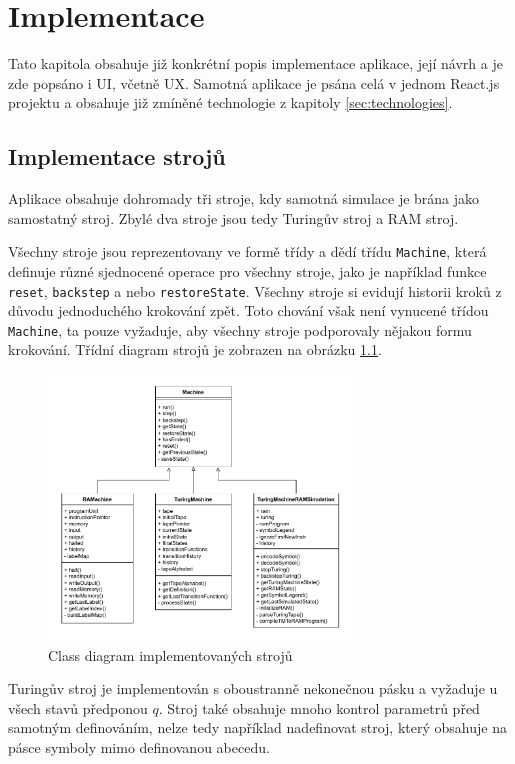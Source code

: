 \chapter{Implementace}
\label{sec:implementation}
Tato kapitola obsahuje již konkrétní popis implementace aplikace, její návrh a je zde popsáno i UI, včetně UX.
Samotná aplikace je psána celá v jednom React.js projektu a obsahuje již zmíněné technologie z kapitoly \ref{sec:technologies}.

\section{Implementace strojů}
\label{sec:machine_impl}
Aplikace obsahuje dohromady tři stroje, kdy samotná simulace je brána jako samostatný stroj. 
Zbylé dva stroje jsou tedy Turingův stroj a RAM stroj.

Všechny stroje jsou reprezentovany ve formě třídy a dědí třídu \texttt{Machine}, která definuje různé sjednocené operace
pro všechny stroje, jako je například funkce \texttt{reset}, \texttt{backstep} a nebo \texttt{restoreState}. 
Všechny stroje si evidují historii kroků z důvodu jednoduchého krokování zpět. 
Toto chování však není vynucené třídou \texttt{Machine}, ta pouze vyžaduje, aby všechny stroje podporovaly nějakou formu krokování.
Třídní diagram strojů je zobrazen na obrázku \ref{fig:class_machines}.

\begin{figure}[h!]
	\centering
	\includegraphics[width=0.72\textwidth]{Figures/class_diagram.pdf}
	\caption{Class diagram implementovaných strojů}
	\label{fig:class_machines}
\end{figure}

Turingův stroj je implementován s oboustranně nekonečnou pásku a vyžaduje u všech stavů předponou $q$.
Stroj také obsahuje mnoho kontrol parametrů před samotným definováním, 
nelze tedy například nadefinovat stroj, který obsahuje na pásce symboly mimo definovanou abecedu.

